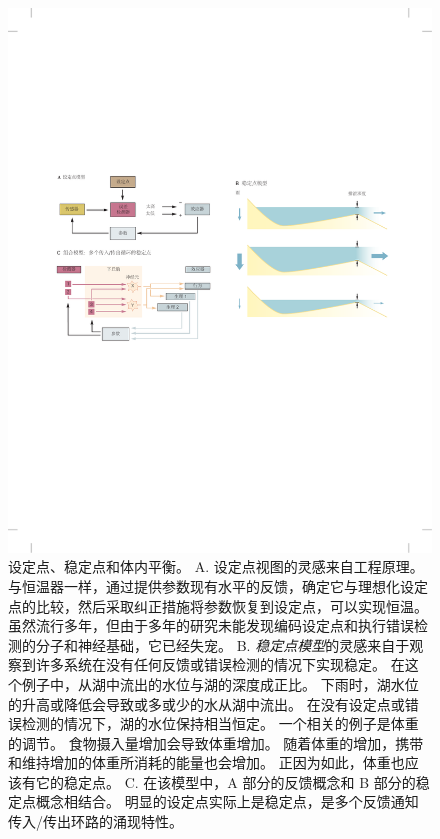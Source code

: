 \begin{figure}[htbp]
	\centering
	\includegraphics[width=1.0\linewidth]{chap41/fig_41_1}
	\caption{设定点、稳定点和体内平衡。
		A. 设定点视图的灵感来自工程原理。
		与恒温器一样，通过提供参数现有水平的反馈，确定它与理想化设定点的比较，然后采取纠正措施将参数恢复到设定点，可以实现恒温。
		虽然流行多年，但由于多年的研究未能发现编码设定点和执行错误检测的分子和神经基础，它已经失宠。
		B. \textit{稳定点模型}的灵感来自于观察到许多系统在没有任何反馈或错误检测的情况下实现稳定。
		在这个例子中，从湖中流出的水位与湖的深度成正比。
		下雨时，湖水位的升高或降低会导致或多或少的水从湖中流出。
		在没有设定点或错误检测的情况下，湖的水位保持相当恒定。
		一个相关的例子是体重的调节。
		食物摄入量增加会导致体重增加。 随着体重的增加，携带和维持增加的体重所消耗的能量也会增加。
		正因为如此，体重也应该有它的稳定点\cite{speakman2011set}。
		C. 在该模型中，A 部分的反馈概念和 B 部分的稳定点概念相结合。
		明显的设定点实际上是稳定点，是多个反馈通知传入/传出环路的涌现特性。}
	\label{fig:41_1}
\end{figure}


